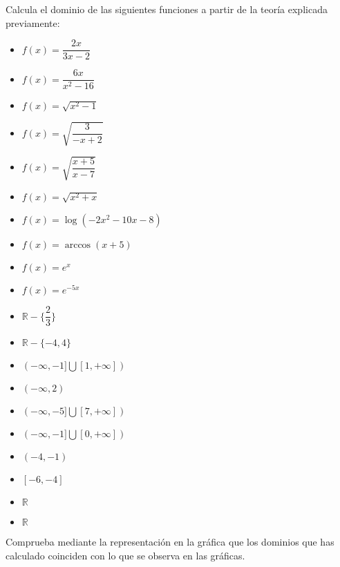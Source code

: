 \begin{ex}
	Calcula el dominio de las siguientes funciones a partir de la teoría explicada previamente:\\
	\begin{itemize}
		\item $f(x) = \dfrac{2x}{3x-2}$
		\item $f(x) = \dfrac{6x}{x^2-16}$
		\item $f(x) = \sqrt{x^2-1}$
		\item $f(x) = \sqrt{\dfrac{3}{-x+2}}$
		\item $f(x) = \sqrt{\dfrac{x+5}{x-7}}$
		\item $f(x) = \sqrt{x^2+x}$
		\item $f(x) = \log(-2x^2-10x-8)$
		\item $f(x) = \arccos(x+5)$
		\item $f(x) = e^x$
		\item $f(x) = e^{-5x}$
	\end{itemize}
	\begin{sol}
		\begin{itemize}
			\item $\mathbb{R}-\{\dfrac{2}{3}\}$
			\item $\mathbb{R}-\{-4, 4\}$
			\item $(-\infty, -1]\bigcup [1, +\infty])$
			\item $(-\infty, 2)$
			\item $(-\infty, -5]\bigcup [7, +\infty])$
			\item $(-\infty, -1]\bigcup [0, +\infty])$
			\item $(-4,-1)$
			\item $[-6, -4]$
			\item $\mathbb{R}$
			\item $\mathbb{R}$
		\end{itemize}
	\end{sol}
\end{ex}

\vspace{1cm}

\begin{ex}
	Comprueba mediante la representación en la gráfica que los dominios que has calculado coinciden con lo que se observa en las gráficas.
	\begin{sol}
	\end{sol}
\end{ex}
